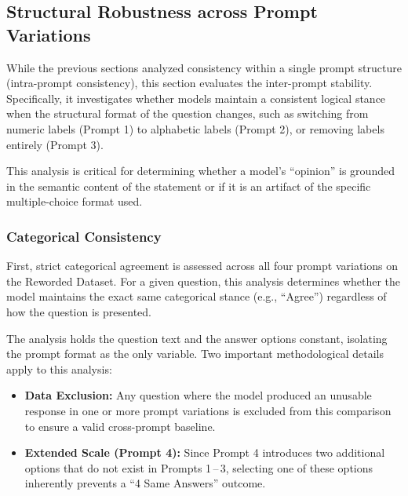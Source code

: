 \subsection{Structural Robustness across Prompt Variations}
\label{results:structural_robustness}

While the previous sections analyzed consistency within a single prompt structure (intra-prompt consistency), this section evaluates the inter-prompt stability. Specifically, it investigates whether models maintain a consistent logical stance when the structural format of the question changes, such as switching from numeric labels (Prompt 1) to alphabetic labels (Prompt 2), or removing labels entirely (Prompt 3).

This analysis is critical for determining whether a model's ``opinion'' is grounded in the semantic content of the statement or if it is an artifact of the specific multiple-choice format used.

\subsubsection{Categorical Consistency}
First, strict categorical agreement is assessed across all four prompt variations on the Reworded Dataset. For a given question, this analysis determines whether the model maintains the exact same categorical stance (e.g., ``Agree'') regardless of how the question is presented.

The analysis holds the question text and the answer options constant, isolating the prompt format as the only variable.
Two important methodological details apply to this analysis:
\begin{itemize}
    \item \textbf{Data Exclusion:} Any question where the model produced an unusable response in one or more prompt variations is excluded from this comparison to ensure a valid cross-prompt baseline.
    \item \textbf{Extended Scale (Prompt 4):} Since Prompt 4 introduces two additional options that do not exist in Prompts 1\,--\,3, selecting one of these options inherently prevents a ``4 Same Answers'' outcome.
\end{itemize}

